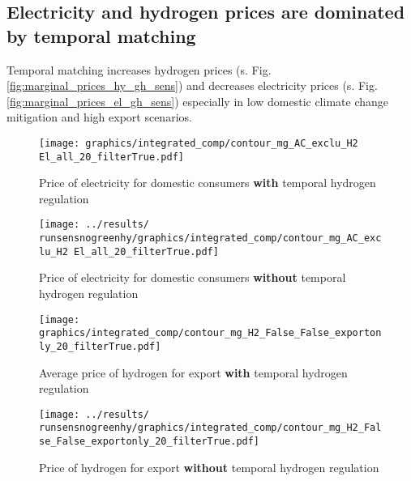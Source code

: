 \subsection{Electricity and hydrogen prices are dominated by temporal matching}
Temporal matching increases hydrogen prices (s. Fig. \ref{fig:marginal_prices_hy_gh_sens}) and decreases electricity prices (s. Fig. \ref{fig:marginal_prices_el_gh_sens}) especially in low domestic climate change mitigation and high export scenarios.


\begin{figure*}[h!] %
    \centering
    \begin{subfigure}[b]{0.49\linewidth}
        \centering
        \texttt{[image: graphics/integrated\_comp/contour\_mg\_AC\_exclu\_H2 El\_all\_20\_filterTrue.pdf]}
        \caption{Price of electricity for domestic consumers {\bf with} temporal hydrogen regulation}
        \label{fig:local_el_price}
    \end{subfigure}
    \hfill
    \begin{subfigure}[b]{0.49\linewidth}
        \centering
        \texttt{[image: ../results/\\runsensnogreenhy/graphics/integrated\_comp/contour\_mg\_AC\_exclu\_H2 El\_all\_20\_filterTrue.pdf]}
        \caption{Price of electricity for domestic consumers {\bf without} temporal hydrogen regulation}
        \label{fig:local_el_price_nogreen}
    \end{subfigure}
    \hfill
    \caption{Marginal prices of electricity with and without temporal hydrogen regulation}
    \label{fig:marginal_prices_el_gh_sens}
\end{figure*}


\begin{figure*}[h!] %
    \centering
    \begin{subfigure}[b]{0.49\linewidth}
        \centering
        \texttt{[image: graphics/integrated\_comp/contour\_mg\_H2\_False\_False\_exportonly\_20\_filterTrue.pdf]}
        \caption{Average price of hydrogen for export {\bf with} temporal hydrogen regulation}
        \label{fig:local_hy_price}
    \end{subfigure}
    \hfill
    \begin{subfigure}[b]{0.49\linewidth}
        \centering
        \texttt{[image: ../results/\\runsensnogreenhy/graphics/integrated\_comp/contour\_mg\_H2\_False\_False\_exportonly\_20\_filterTrue.pdf]}
        \caption{Price of hydrogen for export {\bf without} temporal hydrogen regulation}
        \label{fig:local_hy_price_nogreen}
    \end{subfigure}
    \hfill
    \caption{Marginal prices of hydrogen for export with and without temporal hydrogen regulation}
    \label{fig:marginal_prices_hy_gh_sens}
\end{figure*}

